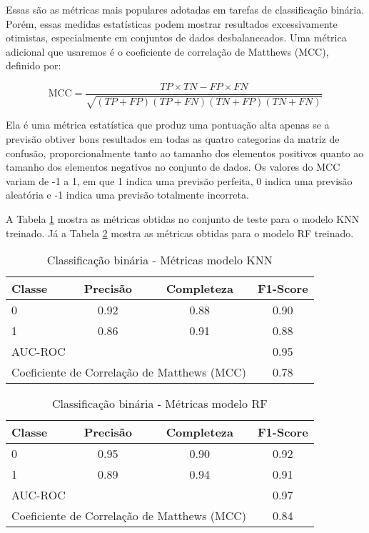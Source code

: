 Essas são as métricas mais populares adotadas em tarefas de classificação binária. Porém, essas medidas estatísticas podem mostrar resultados excessivamente otimistas, especialmente em conjuntos de dados desbalanceados. Uma métrica adicional que usaremos é o coeficiente de correlação de Matthews (MCC), definido por:

\begin{equation}
    \text{MCC} = \frac{TP \times TN - FP \times FN}{\sqrt{(TP + FP)(TP + FN)(TN + FP)(TN + FN)}}
\end{equation}

Ela é uma métrica estatística que produz uma pontuação alta apenas se a previsão obtiver bons resultados em todas as quatro categorias da matriz de confusão, proporcionalmente tanto ao tamanho dos elementos positivos quanto ao tamanho dos elementos negativos no conjunto de dados. Os valores do MCC variam de -1 a 1, em que 1 indica uma previsão perfeita, 0 indica uma previsão aleatória e -1 indica uma previsão totalmente incorreta.

A Tabela \ref{metricas_modelo_knn} mostra as métricas obtidas no conjunto de teste para o modelo KNN treinado. Já a Tabela \ref{metricas_modelo_rf} mostra as métricas obtidas para o modelo RF treinado.

\begin{table}[!ht]
    \centering
    \caption{Classificação binária - Métricas modelo KNN}
    \begin{tabular}{lccc}
        \toprule
        Classe & Precisão & Completeza & F1-Score \\
        \midrule
        0 & 0.92 & 0.88 & 0.90 \\
        1 & 0.86 & 0.91 & 0.88 \\
        \midrule
        \multicolumn{3}{l}{AUC-ROC} & 0.95 \\
        \multicolumn{3}{l}{Coeficiente de Correlação de Matthews (MCC)} & 0.78 \\
        \bottomrule
    \end{tabular}
    \label{metricas_modelo_knn}
\end{table}


\begin{table}[!ht]
    \centering
    \caption{Classificação binária - Métricas modelo RF}
    \begin{tabular}{lccc}
        \toprule
        Classe & Precisão & Completeza & F1-Score \\
        \midrule
        0 & 0.95 & 0.90 & 0.92 \\
        1 & 0.89 & 0.94 & 0.91 \\
        \midrule
        \multicolumn{3}{l}{AUC-ROC} & 0.97 \\
        \multicolumn{3}{l}{Coeficiente de Correlação de Matthews (MCC)} & 0.84 \\
        \bottomrule
    \end{tabular}
    \label{metricas_modelo_rf}
\end{table}

